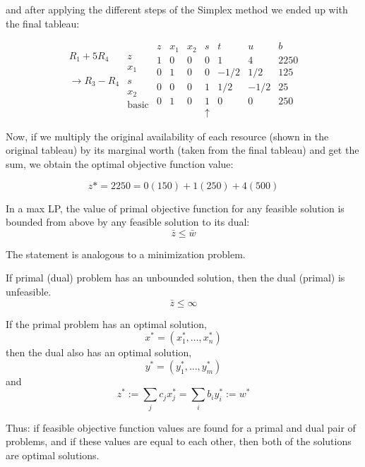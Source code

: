 and after applying the different steps of the Simplex method we ended up with the final tableau:

  \begin{equation*}
  \begin{array}{cc}
  &\\
  R_1+5R_4&z \\
  &x_1 \\
  \rightarrow R_3-R_4&s \\
  &x_2\\
  &\mathrm{basic} \\
  \end{array}
  \begin{array}{c|ccccc|c}
    z & x_1 & x_2 & s & t & u & b \\ \hline
    1 & 0 & 0 & 0 & 1 & 4 & 2250 \\ \hline
    0 & 1 & 0 & 0 & -1/2 & 1/2 & 125  \\
    0 & 0 & 0 & 1 & 1/2 & -1/2 & 25 \\
    0 & 1 & 0 & 1 & 0 & 0 & 250 \\
      &  & & \uparrow& & &
  \end{array}
  \end{equation*}

Now, if we multiply the original availability of each resource (shown in the original tableau) by its marginal worth (taken from the final tableau) and get the sum, we obtain the optimal objective function value:

\[
z* = 2250 = 0(150)+1(250)+4(500)
\]




\begin{theorem}
  In a max LP, the value of primal objective function for any feasible solution is bounded from above by any feasible solution to its dual:
  \[\bar{z} \leq \bar{w} \]
  \label{the:weak}
\end{theorem}
The statement is analogous to a minimization problem.
\begin{theorem}
  If primal (dual) problem has an unbounded solution, then the dual (primal) is unfeasible.
  \[\bar{z} \leq \infty \]
\end{theorem}



\begin{theorem}
  If the primal problem has an optimal solution,
  \[
  x^* = (x_1^*, \ldots, x_n^*)
  \]
  then the dual also has an optimal solution,
  \[
  y^* = (y_1^*, \ldots, y_m^*)
  \]
and
\[
z^* := \sum_j c_j x_j^* = \sum_i b_i y_i^* := w^*
\]
\label{the:strong}
\end{theorem}
Thus: if feasible objective function values are found for a primal and dual pair of problems, and if these values are equal to each other, then both of the solutions are optimal solutions.

